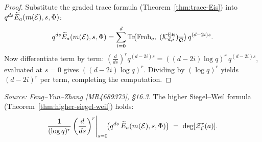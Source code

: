 \begin{proof}
  Substitute the graded trace formula (Theorem~\ref{thm:trace-Eis}) into
  \(q^{ds}\widetilde{E}_a(m(\mathcal{E}),s,\Phi)\):
  \[
    q^{ds}\widetilde{E}_a(m(\mathcal{E}),s,\Phi)
    = \sum_{i=0}^d
    \operatorname{Tr}\!\bigl(\operatorname{Frob}_q,\; (\mathcal{K}^{\mathrm{Eis}}_{d,i})_{\overline{\mathcal{Q}}}\bigr)\,
    q^{(d-2i)s}.
  \]
  Now differentiate term by term: \((\frac{d}{ds})^r q^{(d-2i)s} =
  ((d-2i)\log q)^r\, q^{(d-2i)s}\), evaluated at \(s=0\) gives
  \(((d-2i)\log q)^r\). Dividing by \((\log q)^r\) yields \((d-2i)^r\) per term,
  completing the computation.
\end{proof}

\begin{theorem}
  \label{thm:main-assembly}
  \textit{Source: Feng--Yun--Zhang [MR4689373], \S16.3.}
  The higher Siegel--Weil formula (Theorem~\ref{thm:higher-siegel-weil}) holds:
  \[
    \frac{1}{(\log q)^r}
    \left(\frac{d}{ds}\right)^r\!\Bigg|_{s=0}
    \!\bigl(q^{d s}\,\widetilde{E}_a(m(\mathcal{E}), s, \Phi)\bigr)
    \;=\; \deg[\mathcal{Z}_{\mathcal{E}}^r(a)].
  \]
\end{theorem}

